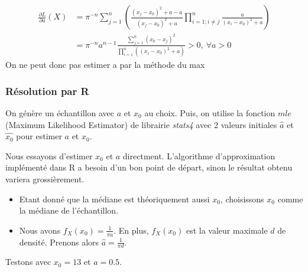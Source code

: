 \documentclass[12pt,a4paper,titlepage]{article}
\numberwithin{equation}{section}
\begin{document}
\begin{align*}
\frac{{\partial L}}{{\partial a}}\left( X \right) & = {\pi ^{ - n}}\sum\limits_{j = 1}^n {\left( {\frac{{{{\left( {{x_j} - {x_0}} \right)}^2} + a - a}}{{{{\left( {{x_j} - {x_0}} \right)}^2} + a}}\prod\limits_{i = 1;i \ne j}^n {\frac{a}{{{{\left( {{x_i} - {x_0}} \right)}^2} + a}}} } \right)}\\
&  = {\pi ^{ - n}}{a^{n - 1}}\frac{{\sum\limits_{j = 1}^n {{{\left( {{x_0} - {x_j}} \right)}^2}} }}{{\prod\limits_{i = 1}^n {\left( {{{\left( {{x_i} - {x_0}} \right)}^2} + a} \right)} }} > 0,\ \forall a > 0
\end{align*}
On ne peut donc pas estimer a par la méthode du max

\subsubsection*{Résolution par R}

On génère un échantillon avec $a$ et $x_0$ au choix. Puis, on utilise la fonction $mle$ (Maximum Likelihood Estimator) de librairie \emph{stats4} avec 2 valeurs initiales $\hat{a}$ et $\hat{x_0}$ pour estimer $a$ et $x_0$.

Nous essayons d'estimer $x_0$ et $a$ directment. L'algorithme d'approximation implémenté dans R a besoin d'un bon point de départ, sinon le résultat obtenu variera grossièrement.
\begin{itemize}
\item Etant donné que la médiane est théoriquement aussi $x_0$, choisissons $x_0$ comme la médiane de l'échantillon.
\item Nous avons ${f_X}\left( {{x_0}} \right) = \frac{1}{{\pi a}}$. En plus, $f_X(x_0)$ est la valeur maximale $d$ de densité. Prenons alors $\hat a = \frac{1}{{\pi d}}$.
\end{itemize}

Testons avec $x_0=13$ et $a=0.5$.


\end{document}
